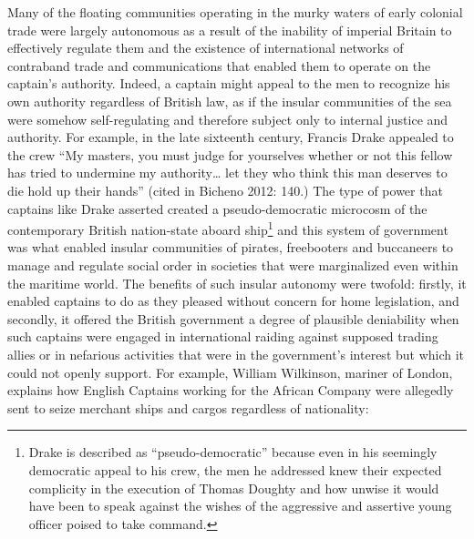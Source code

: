 \documentclass[12pt]{article}
\newenvironment{styleStandard}{\renewcommand\baselinestretch{1.0}\setlength\leftskip{0cm}\setlength\rightskip{0cm plus 1fil}\setlength\parindent{0cm}\setlength\parfillskip{0pt plus 1fil}\setlength\parskip{0in plus 1pt}\writerlistparindent\writerlistleftskip\leavevmode\normalfont\normalsize\writerlistlabel\ignorespaces}{\unskip\vspace{0in plus 1pt}\par}
\newcommand\writerlistleftskip{}
\newcommand\writerlistparindent{}
\newcommand\writerlistlabel{}
\begin{document}
\begin{styleStandard}
Many of the floating communities operating in the murky waters of early colonial trade were largely autonomous as a result of the inability of imperial Britain to effectively regulate them and the existence of international networks of contraband trade and communications that enabled them to operate on the captain’s authority. Indeed, a captain might appeal to the men to recognize his own authority regardless of British law, as if the insular communities of the sea were somehow self-regulating and therefore subject only to internal justice and authority. For example, in the late sixteenth century, Francis Drake appealed to the crew “My masters, you must judge for yourselves whether or not this fellow has tried to undermine my authority… let they who think this man deserves to die hold up their hands” (cited in Bicheno 2012: 140.) The type of power that captains like Drake asserted created a pseudo-democratic microcosm of the contemporary British nation-state aboard ship\footnote{ Drake is described as “pseudo-democratic” because even in his seemingly democratic appeal to his crew, the men he addressed knew their expected complicity in the execution of Thomas Doughty and how unwise it would have been to speak against the wishes of the aggressive and assertive young officer poised to take command. } and this system of government was what enabled insular communities of pirates, freebooters and buccaneers to manage and regulate social order in societies that were marginalized even within the maritime world. The benefits of such insular autonomy were twofold: firstly, it enabled captains to do as they pleased without concern for home legislation, and secondly, it offered the British government a degree of plausible deniability when such captains were engaged in international raiding against supposed trading allies or in nefarious activities that were in the government’s interest but which it could not openly support. For example, William Wilkinson, mariner of London, explains how English Captains working for the African Company were allegedly sent to seize merchant ships and cargos regardless of nationality: 
\end{styleStandard}
\end{document}
